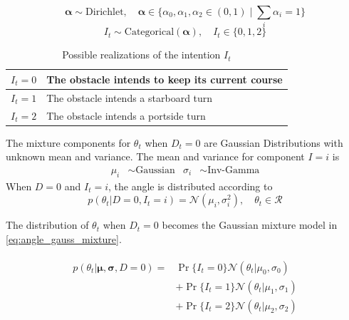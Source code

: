 \begin{equation}
    \boldsymbol{\alpha} \sim \text{Dirichlet}, \quad \boldsymbol{\alpha} \in \{\alpha_0, \alpha_1, \alpha_2 \in (0, 1) \; | \; \sum_i \alpha_i = 1 \}
\end{equation}
\begin{equation}
    I_t \sim \text{Categorical}(\boldsymbol{\alpha}), \quad I_t \in \{0, 1, 2\}
\end{equation}

\begin{table}[h]
\centering
\begin{tabular}{|l|l|}
\hline
$I_t=0$ & The obstacle intends to keep its current course \\ \hline
$I_t=1$ & The obstacle intends a starboard turn           \\ \hline
$I_t=2$ & The obstacle intends a portside turn            \\ \hline
\end{tabular}
\caption{Possible realizations of the intention $I_t$}
\label{tbl:intentions}
\end{table}


The mixture components for $\theta_t$ when $D_t=0$ are Gaussian Distributions with unknown mean and variance. The mean and variance for component $I=i$ is 
\begin{align}
    \mu_{i} &\sim \text{Gaussian} & \sigma_i &\sim \text{Inv-Gamma}
\end{align}
When $D=0$ and $I_t=i$, the angle is distributed according to
\begin{equation}\label{eq:theta_intention_mixture}
    p(\theta_t | D=0, I_t=i) = \mathcal{N}(\mu_i, \sigma_i^2), \quad \theta_t \in \mathcal{R}
\end{equation}

The distribution of $\theta_t$ when $D_t=0$ becomes the Gaussian mixture model in \cref{eq:angle_gauss_mixture}.

\begin{align}\label{eq:angle_gauss_mixture}
\begin{split}
    p(\theta_t | \boldsymbol{\mu}, \boldsymbol{\sigma}, D=0) = &\Pr\{I_t=0\}\mathcal{N}(\theta_t | \mu_0, \sigma_0)\\
    &+ \Pr\{I_t=1\}\mathcal{N}(\theta_t | \mu_1, \sigma_1)\\
    &+ \Pr\{I_t=2\}\mathcal{N}(\theta_t | \mu_2, \sigma_2)
\end{split}
\end{align}

